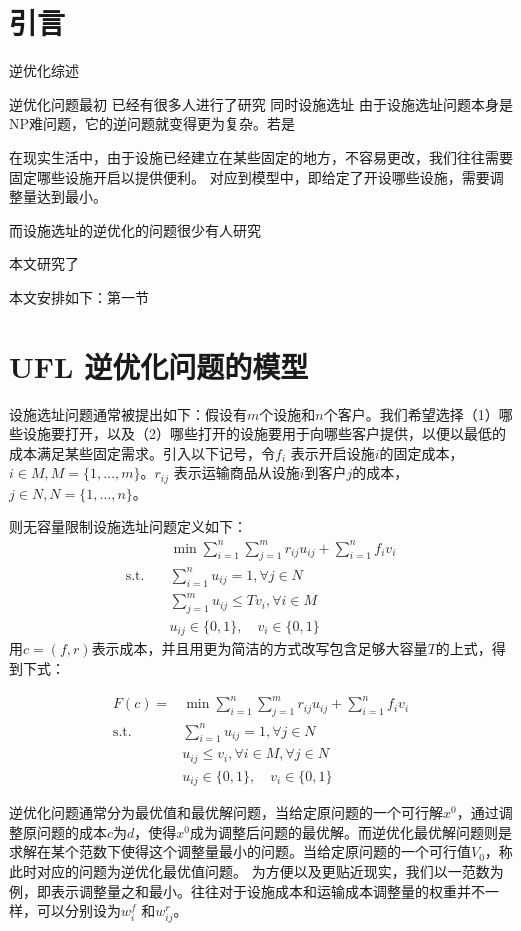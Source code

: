 \documentclass[UTF8]{article}
\begin{document}
\section{引言}  %
逆优化综述

逆优化问题最初
已经有很多人进行了研究
同时设施选址
由于设施选址问题本身是NP难问题，它的逆问题就变得更为复杂。若是

在现实生活中，由于设施已经建立在某些固定的地方，不容易更改，我们往往需要固定哪些设施开启以提供便利。
对应到模型中，即给定了开设哪些设施，需要调整量达到最小。

而设施选址的逆优化的问题很少有人研究

本文研究了

本文安排如下：第一节

\section{ UFL 逆优化问题的模型}

设施选址问题通常被提出如下：假设有$m$个设施和$n$个客户。我们希望选择（1）哪些设施要打开，以及（2）哪些打开的设施要用于向哪些客户提供，以便以最低的成本满足某些固定需求。引入以下记号，令$f_i$ 表示开启设施$i$的固定成本，$i \in M, M=\{1,\ldots,m\}$。$r_{ij}$ 表示运输商品从设施$i$到客户$j$的成本，$j \in N, N=\{1,\ldots,n\}$。

则无容量限制设施选址问题定义如下：
\begin{align*}
&\min \sum_{i=1}^n \sum_{j=1}^m r_{ij}u_{ij} + \sum_{i=1}^n f_i v_i \\
\text{s.t.}\quad & \sum_{i=1}^n u_{ij} =1, \forall j \in N  \\
&\sum_{j=1}^m u_{ij}  \leq Tv_i, \forall i \in M \\
& u_{ij} \in \{0,1\}, \quad v_{i} \in \{0,1\}
\end{align*}
用$c=(f,r)$表示成本，并且用更为简洁的方式改写包含足够大容量$T$的上式，得到下式：

\begin{align*}
F(c) = &\min \sum_{i=1}^n \sum_{j=1}^m r_{ij}u_{ij} + \sum_{i=1}^n f_i v_i \\
\text{s.t.}\quad & \sum_{i=1}^n u_{ij} =1, \forall j \in N  \\
& u_{ij}  \leq v_i, \forall i \in M ,\forall j \in N\\
& u_{ij} \in \{0,1\}, \quad v_{i} \in \{0,1\}
\end{align*}

逆优化问题通常分为最优值和最优解问题，当给定原问题的一个可行解$x^0$，通过调整原问题的成本$c$为$d$，使得$x^0$成为调整后问题的最优解。而逆优化最优解问题则是求解在某个范数下使得这个调整量最小的问题。当给定原问题的一个可行值$V_0$，称此时对应的问题为逆优化最优值问题。
为方便以及更贴近现实，我们以一范数为例，即表示调整量之和最小。往往对于设施成本和运输成本调整量的权重并不一样，可以分别设为$w_i^f$ 和$w_{ij}^r$。
\end{document}
